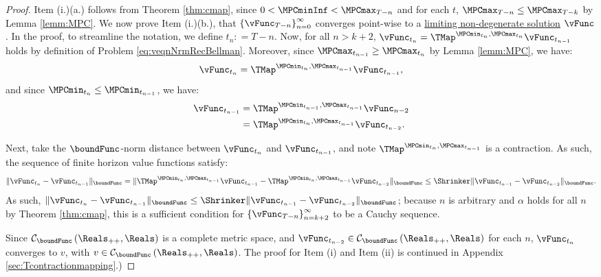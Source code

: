 \documentclass[BufferStockTheory]{subfiles}
\begin{document}
\begin{proof}

Item (i.)(a.) follows from Theorem \ref{thm:cmap}, since $0<\MPCminInf<\MPCmax_{T-n}$ and for each $t$, $\MPCmax_{T-n}\leq \MPCmax_{T-k}$ by Lemma \ref{lemm:MPC}.
We now prove Item (i.)(b.), that $\left\{\vFunc_{T-n}\right\}_{n=0}^{\infty}$ converges point-wise to a \hyperlink{Definition-of-a-non-degenerate-Solution}{limiting non-degenerate solution} $\vFunc$.
In the proof, to streamline the notation, we define $t_{n}\colon = T - n$.
Now, for all $n>k+2$, $\vFunc_{t_{n}} = \TMap^{\MPCmin_{t_{n}}, \MPCmax_{t_{n}}}\vFunc_{t_{n-1}}$ holds by definition of Problem \eqref{eq:veqnNrmRecBellman}.
Moreover, since $\MPCmax_{t_{n-1}}\geq \MPCmax_{t_{n}}$ by Lemma \ref{lemm:MPC}, we have:
%
\begin{equation*}
\vFunc_{t_{n}} = \TMap^{\MPCmin_{t_{n}}, \MPCmax_{t_{n-1}}}\vFunc_{t_{n-1}}, 
\end{equation*}
%
and since $\MPCmin_{t_{n}}\leq \MPCmin_{t_{n-1}}$, we have:
%
\begin{align*}
\vFunc_{t_{n-1}} &  = \TMap^{\MPCmin_{t_{n-1}}, \MPCmax_{t_{n-1}}}\vFunc_{n-2}\\ &  = \TMap^{\MPCmin_{t_{n}}, \MPCmax_{t_{n-1}}}\vFunc_{t_{n-2}}. 
\end{align*}

Next, take the $\boundFunc$-norm distance between $\vFunc_{t_{n}}$ and $\vFunc_{t_{n-1}}$, and note  $\TMap^{\MPCmin_{t_{n}}, \MPCmax_{t_{n-1}}}$ is a contraction.
As such, the sequence of finite horizon value functions satisfy:
%
\begin{equation*}
\Vert\vFunc_{t_{n}} - \vFunc_{t_{n-1}}\Vert_{\boundFunc} = \Vert\TMap^{\MPCmin_{t_{n}}, \MPCmax_{t_{n-1}}}\vFunc_{t_{n-1}} - \TMap^{\MPCmin_{t_{n}}, \MPCmax_{t_{n-1}}}\vFunc_{t_{n-2}}\Vert_{\boundFunc} \leq \Shrinker \Vert \vFunc_{t_{n-1}} - \vFunc_{t_{n-2}}\Vert_{\boundFunc}. 
\end{equation*}
%
As such, $\Vert \vFunc_{t_{n}} - \vFunc_{t_{n-1}}\Vert_{\boundFunc } \leq \Shrinker \Vert \vFunc_{t_{n-1}} - \vFunc_{t_{n-2}}\Vert_{\boundFunc } $; because $n$ is arbitrary and $\alpha$ holds for all $n$ by Theorem \ref{thm:cmap}, this is a sufficient condition for  $\left\{\vFunc_{T-n}\right\}_{n=k+2}^{\infty}$ to be a Cauchy sequence.

Since $\mathcal{C}_{\boundFunc }\left(\Reals_{++},\Reals\right) $ is a complete metric space, and $\vFunc_{t_{n-2}} \in \mathcal{C}_{\boundFunc }\left(\Reals_{++},\Reals\right)$ for each $n$, $\vFunc_{t_{n}}$ converges to $v$, with $v\in \mathcal{C}_{\boundFunc }\left(\Reals_{++},\Reals\right)$.
The proof for Item (i) and Item (ii) is continued in Appendix \ref{sec:Tcontractionmapping}.)
\end{proof}
\end{document}
